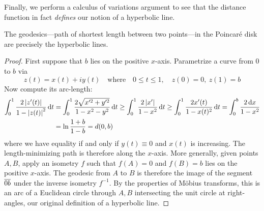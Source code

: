 
Finally, we perform a calculus of variations argument to see that the distance function in fact \emph{defines} our notion of a hyperbolic line.


\begin{thm}{}{}
	The geodesics---path of shortest length between two points---in the Poincaré disk are precisely the hyperbolic lines.
\end{thm}

\begin{proof}
	First suppose that $b$ lies on the positive $x$-axis. Parametrize a curve from $0$ to $b$ via
	\[
		z(t)=x(t)+iy(t)\quad\text{where}\quad 0\le t\le 1,\quad z(0)=0,\ z(1)=b
	\]
	Now compute its arc-length:
	\begin{align*}
		\int_{0}^{1}\frac{2\left| z'(t)\right|}{1-\left| z(t)\right|^2}\,{\mathrm{d} t}
		&=\int_{0}^{1}\frac{2\sqrt{x'^2+y'^2}}{1-x^2-y^2}\,{\mathrm{d} t}\ge \int_{0}^{1}\frac{2\left| x'\right|}{1-x^2}\,{\mathrm{d} t}\ge \int_{0}^{1}\frac{2x'(t)}{1-x(t)^2}\,{\mathrm{d} t} =\int_0^b\frac{2\,{\mathrm{d} x}}{1-x^2}\\
		&=\ln\frac{1+b}{1-b}=d(0,b)
	\end{align*}
	where we have equality if and only if $y(t)\equiv 0$ and $x(t)$ is increasing. The length-minimizing path is therefore along the $x$-axis.\smallbreak
	More generally, given points $A,B$, apply an isometry $f$ such that $f(A)=0$ and $f(B)=b$ lies on the positive $x$-axis. The geodesic from $A$ to $B$ is therefore the image of the segment $\overline{0b}$ under the inverse isometry $f^{-1}$. By the properties of Möbius transforms, this is an arc of a Euclidean circle through $A,B$ intersecting the unit circle at right-angles, our original definition of a hyperbolic line.
\end{proof}

